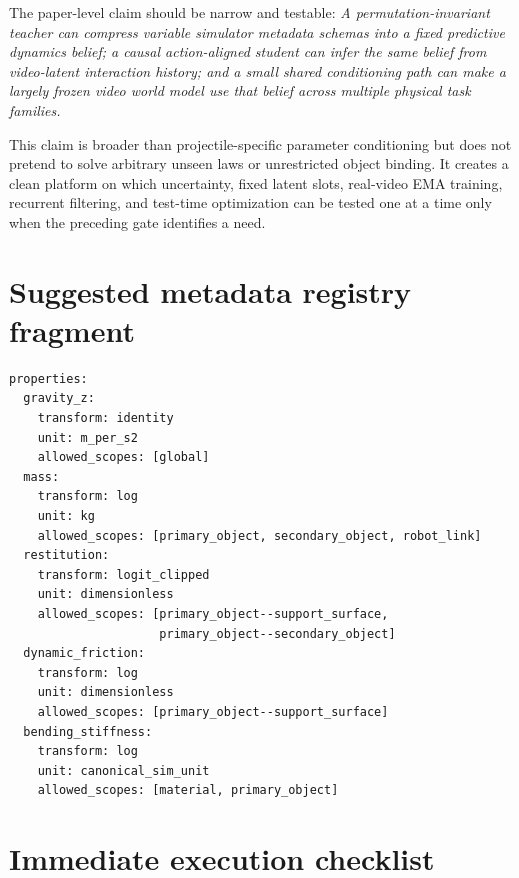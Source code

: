\documentclass[11pt]{article}
\begin{document}
\begin{decisionbox}
The paper-level claim should be narrow and testable:
\emph{A permutation-invariant teacher can compress variable simulator metadata
schemas into a fixed predictive dynamics belief; a causal action-aligned
student can infer the same belief from video-latent interaction history; and a
small shared conditioning path can make a largely frozen video world model use
that belief across multiple physical task families.}
\end{decisionbox}

This claim is broader than projectile-specific parameter conditioning but does
not pretend to solve arbitrary unseen laws or unrestricted object binding.  It
creates a clean platform on which uncertainty, fixed latent slots, real-video
EMA training, recurrent filtering, and test-time optimization can be tested one
at a time only when the preceding gate identifies a need.

\appendix
\section{Suggested metadata registry fragment}

\begin{lstlisting}[style=pythonstyle]
properties:
  gravity_z:
    transform: identity
    unit: m_per_s2
    allowed_scopes: [global]
  mass:
    transform: log
    unit: kg
    allowed_scopes: [primary_object, secondary_object, robot_link]
  restitution:
    transform: logit_clipped
    unit: dimensionless
    allowed_scopes: [primary_object--support_surface,
                     primary_object--secondary_object]
  dynamic_friction:
    transform: log
    unit: dimensionless
    allowed_scopes: [primary_object--support_surface]
  bending_stiffness:
    transform: log
    unit: canonical_sim_unit
    allowed_scopes: [material, primary_object]
\end{lstlisting}

\section{Immediate execution checklist}
\end{document}
